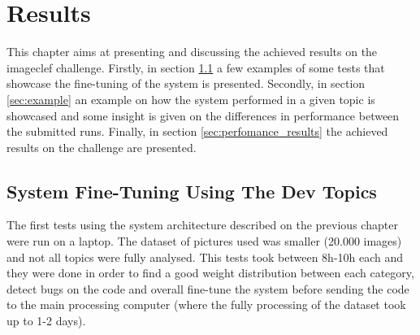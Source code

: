 \cleardoublepage
\chapter{Results}
\label{ch:results}

This chapter aims at presenting and discussing the achieved results on the imageclef challenge. Firstly, in section \ref{sec:first} a few examples of some tests that showcase the fine-tuning of the system is presented. Secondly, in section \ref{sec:example} an example on how the system performed in a given topic is showcased and some insight is given on the differences in performance between the submitted runs. Finally, in section \ref{sec:perfomance_results} the achieved results on the challenge are presented.

\section{System Fine-Tuning Using The Dev Topics}
\label{sec:first}

The first tests using the system architecture described on the previous chapter were run on a laptop. The dataset of pictures used was smaller (20.000 images) and not all topics were fully analysed. This tests took between 8h-10h each and they were done in order to find a good weight distribution between each category, detect bugs on the code and overall fine-tune the system before sending the code to the main processing computer (where the fully processing of the dataset took up to 1-2 days).

